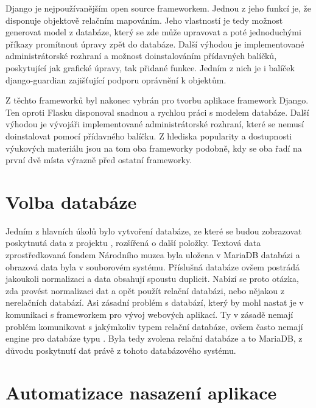Django je nejpoužívanějším open source frameworkem. Jednou z jeho funkcí je, že
disponuje objektově relačním mapováním. Jeho vlastností je tedy možnost generovat
model z databáze, který se zde může upravovat a poté jednoduchými
příkazy promítnout úpravy zpět do databáze. Další výhodou je implementované
administrátorské rozhraní a možnost doinstalováním přídavných balíčků,
poskytující jak grafické úpravy, tak přidané funkce. Jedním z nich je
i balíček django-guardian zajišťující podporu oprávnění k objektům. \cite{django}


Z těchto frameworků byl nakonec vybrán pro tvorbu aplikace framework
Django. Ten oproti Flasku disponoval snadnou a rychlou práci s modelem
databáze. Další výhodou je vývojáři implementované administrátorské
rozhraní, které se nemusí doinstalovat pomocí přídavného balíčku. Z
hlediska popularity a dostupnosti výuko\-vých materiálu jsou na tom oba
frameworky podobně, kdy se oba řadí na první dvě místa výrazně před
ostatní frameworky.

\vspace{10px}

\section{Volba databáze}

Jedním z hlavních úkolů bylo vytvoření databáze, ze které se budou
zobrazovat poskytnutá data z projektu , rozšířená o další
položky. Textová data zprostředkovaná fondem Národního muzea byla uložena v
MariaDB databázi a obrazová data byla v souborovém systému. Příslušná
databáze ovšem postrádá jakoukoli normalizaci a data obsahují spoustu
duplicit. Nabízí se proto otázka, zda provést normalizaci dat a opět
použít relační databázi, nebo nějakou z nerelačních
databází. Asi zásadní problém s  databází, který by mohl nastat
je v komunikaci s frameworkem pro vývoj webových aplikací. Ty
v zásadě nemají problém komunikovat s jakýmkoliv typem relační
databáze, ovšem často nemají engine pro databáze typu . Byla 
tedy zvolena relační databáze a to MariaDB, z důvodu poskytnutí dat právě
z tohoto databázového systému. \cite{django} \cite{mariadb}

\newpage

\section{Automatizace nasazení aplikace}


